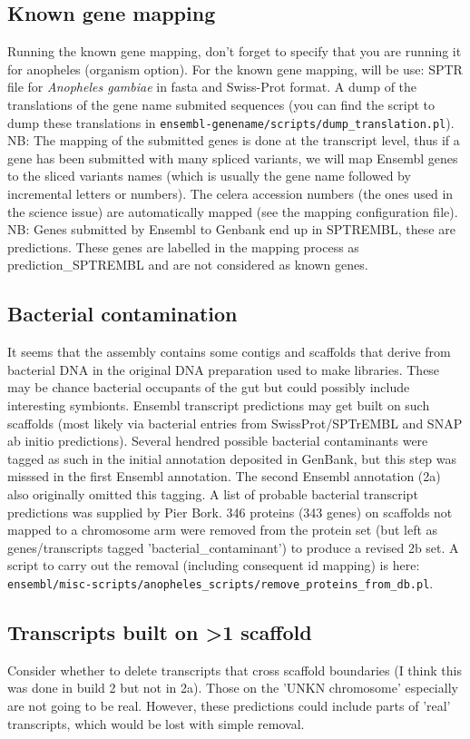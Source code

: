 \documentclass[a4paper,10pt]{article}
\begin{document}
\subsection{Known gene mapping}
Running the known gene mapping, don't forget to specify that you are running it for anopheles (organism option). For the known gene mapping, will be use: SPTR file for \textit{Anopheles gambiae} in fasta and Swiss-Prot format. A dump of the translations of the gene name submited sequences (you can find the script to dump these translations in \texttt{ensembl-genename/scripts/dump\_translation.pl}). NB: The mapping of the submitted genes is done at the transcript level, thus if a gene has been submitted with many spliced variants, we will map Ensembl genes to the sliced variants names (which is usually the gene name followed by incremental letters or numbers).
The celera accession numbers (the ones used in the science issue) are automatically mapped (see the mapping configuration file). 
NB: Genes submitted by Ensembl to Genbank end up in SPTREMBL, these are predictions. These genes are labelled in the mapping process as prediction\_SPTREMBL and are not considered as known genes.

\subsection{Bacterial contamination}
It seems that the assembly contains some contigs and scaffolds that derive from bacterial DNA in the original DNA preparation used to make libraries.  These may be chance bacterial occupants of the gut but could possibly include interesting symbionts. Ensembl transcript predictions may get built on such scaffolds (most likely via bacterial entries from SwissProt/SPTrEMBL and SNAP ab initio predictions). Several hendred possible bacterial contaminants were tagged as such in the initial annotation deposited in GenBank, but this step was misssed in the first Ensembl annotation.  The second Ensembl annotation (2a) also originally omitted this tagging.  A list of probable bacterial transcript predictions was supplied by Pier Bork.  346 proteins (343 genes) on scaffolds not mapped to a chromosome arm were removed from the protein set (but left as genes/transcripts tagged 'bacterial\_contaminant') to produce a revised 2b set. A script to carry out the removal (including consequent id mapping) is here:\\
 \texttt{ensembl/misc-scripts/anopheles\_scripts/remove\_proteins\_from\_db.pl}.

\subsection{Transcripts built on >1 scaffold}
Consider whether to delete transcripts that cross scaffold boundaries (I think this was done in build 2 but not in 2a).  Those on the 'UNKN chromosome' especially are not going to be real. However, these predictions could include parts of 'real' transcripts, which would be lost with simple removal.
\end{document}
